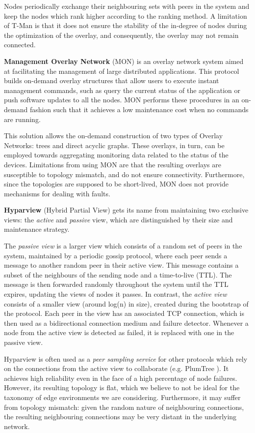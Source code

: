 Nodes periodically exchange their neighbouring sets with peers in the system and keep the nodes which rank higher according to the ranking method. A limitation of T-Man is that it does not ensure the stability of the in-degree of nodes during the optimization of the overlay, and consequently, the overlay may not remain connected. 

\textbf{Management Overlay Network} \cite{liang2005mon} (MON) is an overlay network system aimed at facilitating the management of large distributed applications. This protocol builds on-demand overlay structures that allow users to execute instant management commands, such as query the current status of the application or push software updates to all the nodes. MON performs these procedures in an on-demand fashion such that it achieves a low maintenance cost when no commands are running.

This solution allows the on-demand construction of two types of Overlay Networks: trees and direct acyclic graphs. These overlays, in turn, can be employed towards aggregating monitoring data related to the status of the devices. Limitations from using MON are that the resulting overlays are susceptible to topology mismatch, and do not ensure connectivity. Furthermore, since the topologies are supposed to be short-lived, MON does not provide mechanisms for dealing with faults.

\textbf{Hyparview} \cite{Hyparview} (Hybrid Partial View) gets its name from maintaining two exclusive views: the \textit{active} and \textit{passive} view, which are distinguished by their size and maintenance strategy. 

The \textit{passive view} is a larger view which consists of a random set of peers in the system,  maintained by a periodic gossip protocol, where each peer sends a message to another random peer in their active view. This message contains a subset of the neighbours of the sending node and a time-to-live (TTL). The message is then forwarded randomly throughout the system until the TTL expires, updating the views of nodes it passes. In contrast, the \textit{active view} consists of a smaller view (around log(n) in size), created during the bootstrap of the protocol. Each peer in the view has an associated TCP connection, which is then used as a bidirectional connection medium and failure detector. Whenever a node from the active view is detected as failed, it is replaced with one in the passive view.

Hyparview is often used as a \textit{peer sampling service} for other protocols which rely on the connections from the active view to collaborate (e.g. PlumTree \cite{leitao2007epidemic}). It achieves high reliability even in the face of a high percentage of node failures. However, its resulting topology is flat, which we believe to not be ideal for the taxonomy of edge environments we are considering. Furthermore, it may suffer from topology mismatch: given the random nature of neighbouring connections, the resulting neighbouring connections may be very distant in the underlying network.

